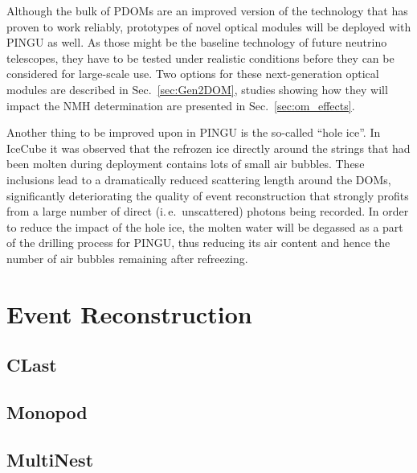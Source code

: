 Although the bulk of PDOMs are an improved version of the technology that has 
proven to work reliably, prototypes of novel optical modules will be deployed 
with PINGU as well. As those might be the baseline technology of future 
neutrino telescopes, they have to be tested under realistic conditions before 
they can be considered for large-scale use. Two options for these 
next-generation optical modules are described in Sec.~\ref{sec:Gen2DOM}, 
studies showing how they will impact the NMH determination are presented in 
Sec.~\ref{sec:om_effects}.

Another thing to be improved upon in PINGU is the so-called ``hole ice''. In 
IceCube it was observed that the refrozen ice directly around the strings that 
had been molten during deployment contains lots of small air bubbles. These 
inclusions lead to a dramatically reduced scattering length around the DOMs,
significantly deteriorating the quality of event reconstruction that strongly
profits from a large number of direct (i.\,e.\ unscattered) photons being
recorded. In order to reduce the impact of the hole ice, the molten water will
be degassed as a part of the drilling process for PINGU, thus reducing its air
content and hence the number of air bubbles remaining after refreezing.

\section{Event Reconstruction}
\label{sec:EvtReco}

\subsection{CLast}
\label{sec:reco_clast}

\subsection{Monopod}
\label{sec:reco_monopod}


\subsection{MultiNest}
\label{sec:reco_multinest}


